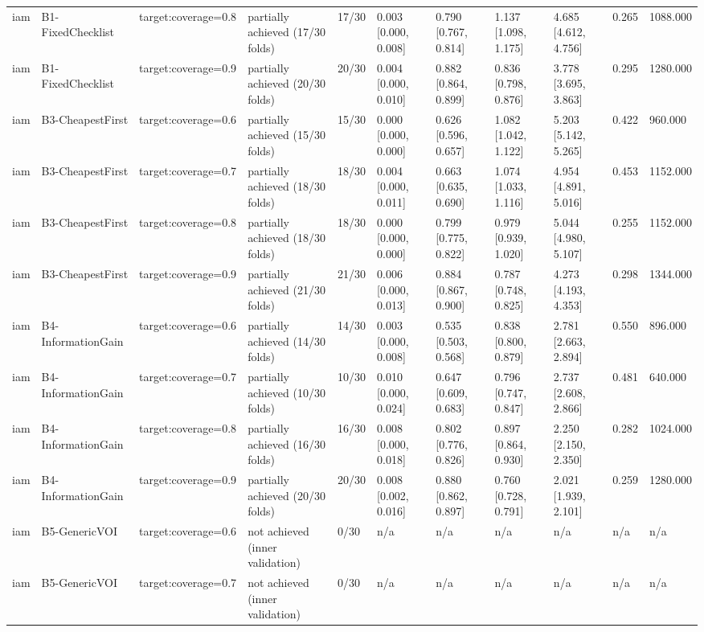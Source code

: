 \begin{table}[!ht]
{\begin{tabular}{lllllllllll}
iam & B1-FixedChecklist & target:coverage=0.8 & partially achieved (17/30 folds) & 17/30 & 0.003 [0.000, 0.008] & 0.790 [0.767, 0.814] & 1.137 [1.098, 1.175] & 4.685 [4.612, 4.756] & 0.265 & 1088.000 \\
iam & B1-FixedChecklist & target:coverage=0.9 & partially achieved (20/30 folds) & 20/30 & 0.004 [0.000, 0.010] & 0.882 [0.864, 0.899] & 0.836 [0.798, 0.876] & 3.778 [3.695, 3.863] & 0.295 & 1280.000 \\
iam & B3-CheapestFirst & target:coverage=0.6 & partially achieved (15/30 folds) & 15/30 & 0.000 [0.000, 0.000] & 0.626 [0.596, 0.657] & 1.082 [1.042, 1.122] & 5.203 [5.142, 5.265] & 0.422 & 960.000 \\
iam & B3-CheapestFirst & target:coverage=0.7 & partially achieved (18/30 folds) & 18/30 & 0.004 [0.000, 0.011] & 0.663 [0.635, 0.690] & 1.074 [1.033, 1.116] & 4.954 [4.891, 5.016] & 0.453 & 1152.000 \\
iam & B3-CheapestFirst & target:coverage=0.8 & partially achieved (18/30 folds) & 18/30 & 0.000 [0.000, 0.000] & 0.799 [0.775, 0.822] & 0.979 [0.939, 1.020] & 5.044 [4.980, 5.107] & 0.255 & 1152.000 \\
iam & B3-CheapestFirst & target:coverage=0.9 & partially achieved (21/30 folds) & 21/30 & 0.006 [0.000, 0.013] & 0.884 [0.867, 0.900] & 0.787 [0.748, 0.825] & 4.273 [4.193, 4.353] & 0.298 & 1344.000 \\
iam & B4-InformationGain & target:coverage=0.6 & partially achieved (14/30 folds) & 14/30 & 0.003 [0.000, 0.008] & 0.535 [0.503, 0.568] & 0.838 [0.800, 0.879] & 2.781 [2.663, 2.894] & 0.550 & 896.000 \\
iam & B4-InformationGain & target:coverage=0.7 & partially achieved (10/30 folds) & 10/30 & 0.010 [0.000, 0.024] & 0.647 [0.609, 0.683] & 0.796 [0.747, 0.847] & 2.737 [2.608, 2.866] & 0.481 & 640.000 \\
iam & B4-InformationGain & target:coverage=0.8 & partially achieved (16/30 folds) & 16/30 & 0.008 [0.000, 0.018] & 0.802 [0.776, 0.826] & 0.897 [0.864, 0.930] & 2.250 [2.150, 2.350] & 0.282 & 1024.000 \\
iam & B4-InformationGain & target:coverage=0.9 & partially achieved (20/30 folds) & 20/30 & 0.008 [0.002, 0.016] & 0.880 [0.862, 0.897] & 0.760 [0.728, 0.791] & 2.021 [1.939, 2.101] & 0.259 & 1280.000 \\
iam & B5-GenericVOI & target:coverage=0.6 & not achieved (inner validation) & 0/30 & n/a & n/a & n/a & n/a & n/a & n/a \\
iam & B5-GenericVOI & target:coverage=0.7 & not achieved (inner validation) & 0/30 & n/a & n/a & n/a & n/a & n/a & n/a \\

\end{tabular}}
\end{table}

